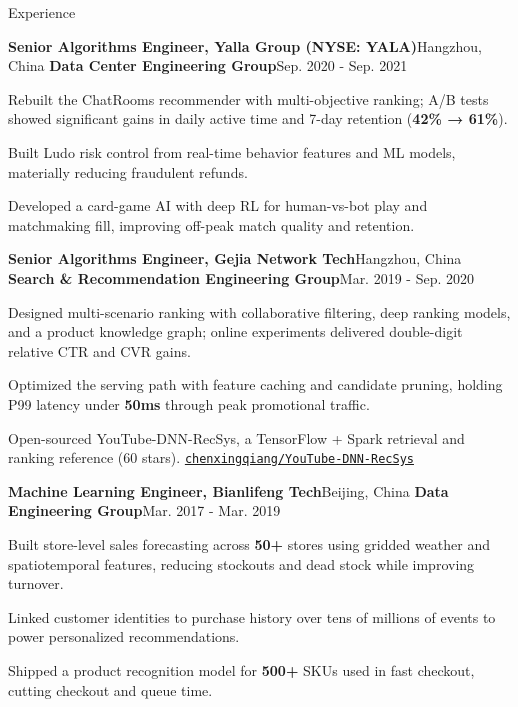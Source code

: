 \documentclass{resume} %
\newcommand{\repo}[2]{\href{#2}{\small\nolinkurl{#1}}}
\begin{document}
\begin{rSection}{Experience}
\begin{rSubsection}{\textbf{Senior Algorithms Engineer, Yalla Group (NYSE: YALA)}}{Hangzhou, China}
{\textbf{Data Center Engineering Group}}{Sep. 2020 - Sep. 2021}
\item {Rebuilt the ChatRooms recommender with multi-objective ranking; A/B tests showed significant gains in daily active time and 7-day retention (\textbf{42\% → 61\%}).}\\
\item {Built Ludo risk control from real-time behavior features and ML models, materially reducing fraudulent refunds.}\\
\item {Developed a card-game AI with deep RL for human-vs-bot play and matchmaking fill, improving off-peak match quality and retention.}\\
\end{rSubsection}

\begin{rSubsection}{\textbf{Senior Algorithms Engineer, Gejia Network Tech}}{Hangzhou, China}
{\textbf{Search \& Recommendation Engineering Group}}{Mar. 2019 - Sep. 2020}
\item {Designed multi-scenario ranking with collaborative filtering, deep ranking models, and a product knowledge graph; online experiments delivered double-digit relative CTR and CVR gains.}\\
\item {Optimized the serving path with feature caching and candidate pruning, holding P99 latency under \textbf{50ms} through peak promotional traffic.}\\
\item {Open-sourced YouTube-DNN-RecSys, a TensorFlow + Spark retrieval and ranking reference (60 stars). \repo{chenxingqiang/YouTube-DNN-RecSys}{https://github.com/chenxingqiang/YouTube-DNN-RecSys}}\\
\end{rSubsection}

\begin{rSubsection}{\textbf{Machine Learning Engineer, Bianlifeng Tech}}{Beijing, China}
{\textbf{Data Engineering Group}}{Mar. 2017 - Mar. 2019}
\item {Built store-level sales forecasting across \textbf{50+} stores using gridded weather and spatiotemporal features, reducing stockouts and dead stock while improving turnover.}\\
\item {Linked customer identities to purchase history over tens of millions of events to power personalized recommendations.}\\
\item {Shipped a product recognition model for \textbf{500+} SKUs used in fast checkout, cutting checkout and queue time.}\\
\end{rSubsection}

\end{rSection}
\end{document}
